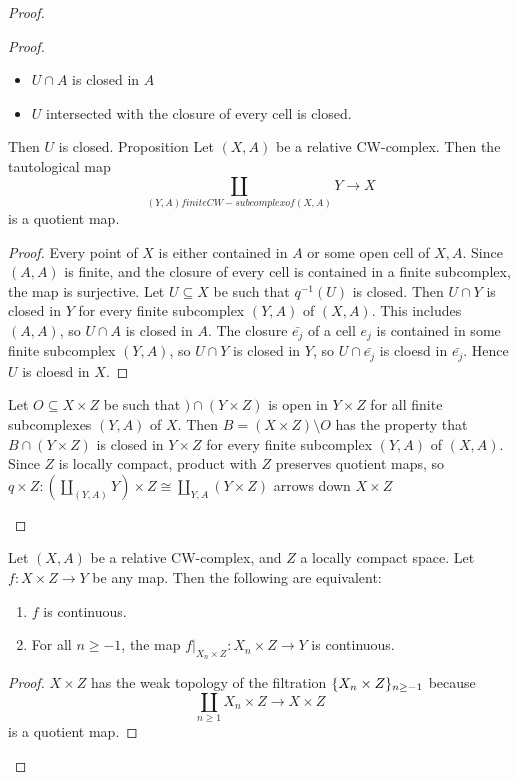 \documentclass{TemplateLecture}
\begin{document}
\begin{proof}
\begin{proof}
\begin{description}
\begin{itemize}
                \item \(U\cap A\) is closed in \(A\)
                \item \(U\) intersected with the closure of every cell is closed.
            \end{itemize}
            Then \(U\) is closed.
            Proposition Let \((X,A)\) be a relative CW-complex. Then the tautological map
            \[\coprod_{(Y,A) finite CW-subcomplex of (X,A)} Y \to X\] is a quotient map.
            \begin{proof}
                Every point of \(X\) is either contained in \(A\) or some open cell of \(X,A\). Since \((A,A)\) is finite, and the closure of every cell is contained in a finite subcomplex, the map is surjective.
                Let \(U\subseteq X\) be such that \(q^{-1}(U)\) is closed. Then \(U\cap Y\) is closed in \(Y\) for every finite subcomplex \((Y,A)\) of \((X,A)\). This includes \((A,A)\), so \(U\cap A\) is closed in \(A\). The closure \(\bar{e_j}\) of a cell \(e_j\) is contained in some finite subcomplex \((Y,A)\), so \(U\cap Y\) is closed in \(Y\), so \(U\cap \bar{e_j}\) is cloesd in \(\bar{e_j}\). Hence \(U\) is cloesd in \(X\).
            \end{proof}
            Let \(O\subseteq X\times Z\) be such that \() \cap (Y \times Z)\) is open in \(Y \times Z\) for all finite subcomplexes \((Y,A)\) of \(X\). Then \(B = (X\times Z)\setminus O\) has the property that \(B\cap (Y\times Z)\) is closed in \(Y\times Z\) for every finite subcomplex \((Y,A)\) of \((X,A)\). Since \(Z\) is locally compact, product with \(Z\) preserves quotient maps, so \(q\times Z\colon (\coprod_{(Y,A)} Y) \times Z \cong \coprod_{Y,A} (Y\times Z)\)
            arrows down
            \(X\times Z\)
        \end{description}
    \end{proof}
    \begin{corollary}
        Let \((X,A)\) be a relative CW-complex, and \(Z\) a locally compact space. Let \(f\colon X\times Z \to Y\) be any map. Then the following are equivalent:
        \begin{enumerate}
            \item \(f\) is continuous.
            \item For all \(n \geq -1\), the map \(f\rvert_{X_n \times Z}\colon X_n \times Z \to Y\) is continuous.
        \end{enumerate}
    \end{corollary}
    \begin{proof}
        \(X\times Z\) has the weak topology of the filtration \(\{X_n \times Z\}_{n \geq -1}\) because
        \[\coprod_{n \geq 1} X_n \times Z \to X \times Z\]
        is a quotient map.
    \end{proof}

\end{proof}
\end{document}
